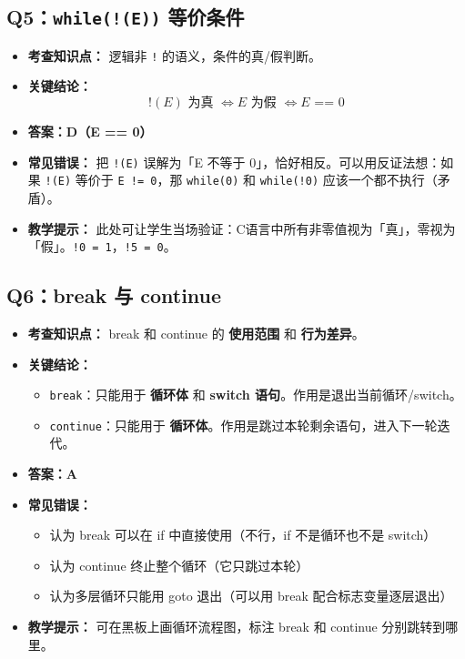 \subsection{Q5：\texttt{while(!(E))} 等价条件}

\begin{itemize}
    \item \textbf{考查知识点：} 逻辑非 \texttt{!} 的语义，条件的真/假判断。
    \item \textbf{关键结论：}
    \[
    !(E) \text{ 为真 } \Leftrightarrow E \text{ 为假 } \Leftrightarrow E \texttt{ == } 0
    \]
    \item {\color{highlight}\textbf{答案：D（E == 0）}}
    \item \textbf{常见错误：} 把 \texttt{!(E)} 误解为「E 不等于 0」，恰好相反。可以用反证法想：如果 \texttt{!(E)} 等价于 \texttt{E != 0}，那 \texttt{while(0)} 和 \texttt{while(!0)} 应该一个都不执行（矛盾）。
    \item \textbf{教学提示：} 此处可让学生当场验证：C语言中所有非零值视为「真」，零视为「假」。\texttt{!0 = 1}，\texttt{!5 = 0}。
\end{itemize}

\subsection{Q6：break 与 continue}

\begin{itemize}
    \item \textbf{考查知识点：} break 和 continue 的 \textbf{使用范围} 和 \textbf{行为差异}。
    \item \textbf{关键结论：}
    \begin{itemize}
        \item \texttt{break}：只能用于 \textbf{循环体} 和 \textbf{switch 语句}。作用是退出当前循环/switch。
        \item \texttt{continue}：只能用于 \textbf{循环体}。作用是跳过本轮剩余语句，进入下一轮迭代。
    \end{itemize}
    \item {\color{highlight}\textbf{答案：A}}
    \item \textbf{常见错误：}
    \begin{itemize}
        \item 认为 break 可以在 if 中直接使用（不行，if 不是循环也不是 switch）
        \item 认为 continue 终止整个循环（它只跳过本轮）
        \item 认为多层循环只能用 goto 退出（可以用 break 配合标志变量逐层退出）
    \end{itemize}
    \item \textbf{教学提示：} 可在黑板上画循环流程图，标注 break 和 continue 分别跳转到哪里。
\end{itemize}

